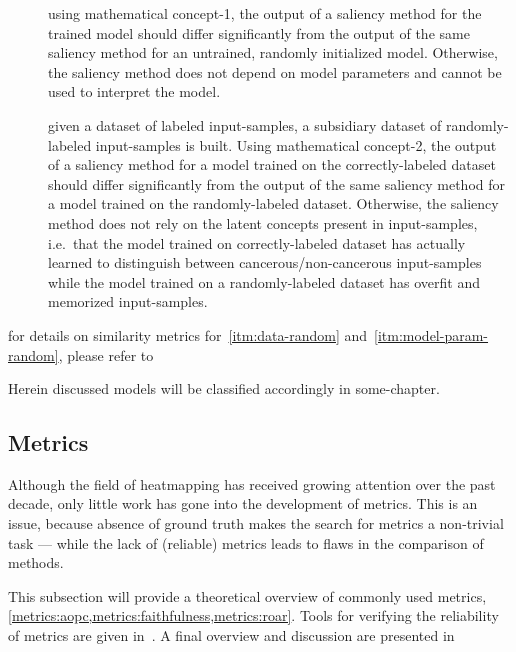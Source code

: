 \begin{description}
    \item[]
     using mathematical concept-1, the output of a saliency method for the trained model should differ significantly from the output of the same saliency method for an untrained, randomly initialized model. Otherwise, the saliency method does not depend on model parameters and cannot be used to interpret the model.
    \item[] given a dataset of labeled input-samples, a subsidiary dataset of randomly-labeled input-samples is built. Using mathematical concept-2, the output of a saliency method for a model trained on the correctly-labeled dataset should differ significantly from the output of the same saliency method for a model trained on the randomly-labeled dataset. Otherwise, the saliency method does not rely on the latent concepts present in input-samples, i.e.\ that the model trained on correctly-labeled dataset has actually learned to distinguish between cancerous/non-cancerous input-samples while the model trained on a randomly-labeled dataset has overfit and memorized input-samples.
\end{description}
for details on similarity metrics for~\ref{itm:data-random} and~\ref{itm:model-param-random}, please refer to~\cite{Adebayo.2018}

Herein discussed models will be classified accordingly in some-chapter. 

\subsection{Metrics}
Although the field of heatmapping has received growing attention over the past decade, only little work has gone into the development of metrics. This is an issue, because absence of ground truth makes the search for metrics a non-trivial task --- while the lack of (reliable) metrics leads to flaws in the comparison of methods.

This subsection will provide a theoretical overview of commonly used metrics, \cref{metrics:aopc,metrics:faithfulness,metrics:roar}. Tools for verifying the reliability of metrics are given in~. A final overview and discussion are presented in~

